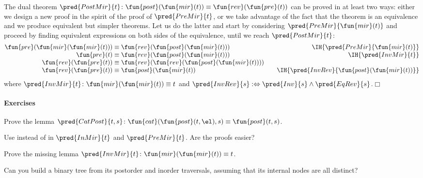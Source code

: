 The dual theorem \(\pred{PostMir}{t}
\colon \fun{post}(\fun{mir}(t)) \equiv
\fun{rev}(\fun{pre}(t))\)
 
 can be proved in at least two ways: either we
design a new proof in the spirit of the proof of \(\pred{PreMir}{t}\),
or we take advantage of the fact that the theorem is an equivalence
and we produce equivalent but simpler theorems. Let us do the latter
and start by considering \(\pred{PreMir}{\fun{mir}(t)}\)
 and proceed by finding equivalent
expressions on both sides of the equivalence, until we reach
\(\pred{PostMir}{t}\):
\begin{equation*}
\begin{array}{@{}r@{\;}c@{\;}l@{\qquad}r@{}}
          \fun{pre}(\fun{mir}(\fun{mir}(t)))
& \equiv
& \fun{rev}(\fun{post}(\fun{mir}(t)))
& \IH{\pred{PreMir}{\fun{mir}(t)}}\\
  \fun{pre}(t)
& \equiv
& \fun{rev}(\fun{post}(\fun{mir}(t)))
& \IH{\pred{InvMir}{t}}\\
  \fun{rev}(\fun{pre}(t))
& \equiv
& \fun{rev}(\fun{rev}(\fun{post}(\fun{mir}(t))))\\
  \fun{rev}(\fun{pre}(t))
& \equiv
& \fun{post}(\fun{mir}(t))
& \IH{\pred{InvRev}{\fun{post}(\fun{mir}(t))}}
\end{array}
\end{equation*}
where \(\pred{InvMir}{t} \colon
\fun{mir}(\fun{mir}(t)) \equiv t\) and
\(\pred{InvRev}{s} :\Leftrightarrow \pred{Inv}{s} \wedge
\pred{EqRev}{s}\).\hfill\(\Box\)

\paragraph{Exercises}
\begin{enumerate*}

  \item Prove the lemma
  \(\pred{CatPost}{t,s} \colon \fun{cat}(\fun{post}(t,\el),s) \equiv
  \fun{post}(t,s)\).

  \item Use  instead of  in
  \(\pred{InMir}{t}\) and \(\pred{PreMir}{t}\). Are the proofs easier?

  \item Prove the missing lemma
  \(\pred{InvMir}{t} \colon \fun{mir}(\fun{mir}(t)) \equiv
  t\).\label{ex:mir_mir}

  \item Can you build a binary tree from its postorder and inorder
    traversals, assuming that its internal nodes are all distinct?

\end{enumerate*}

